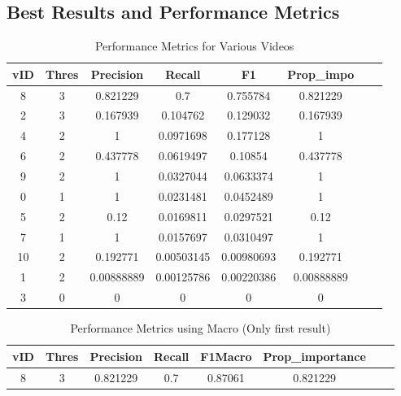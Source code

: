 \documentclass[conference]{IEEEtran}
\begin{document}
\subsection*{Best Results and Performance Metrics}
\begin{table}[H]

\begin{tabular}{|c|c|c|c|c|c|c|c|}
\hline
\textbf{vID} & \textbf{Thres} & \textbf{Precision} & \textbf{Recall} & \textbf{F1} & \textbf{Prop\_impo} \\
\hline
8 & 3 & 0.821229 & 0.7 & 0.755784  & 0.821229 \\
\hline
2 & 3 & 0.167939 & 0.104762 & 0.129032  & 0.167939 \\
\hline
4 & 2 & 1 & 0.0971698 & 0.177128  & 1 \\
\hline
6 & 2 & 0.437778 & 0.0619497 & 0.10854 & 0.437778 \\
\hline
9 & 2 & 1 & 0.0327044 & 0.0633374  & 1 \\
\hline
0 & 1 & 1 & 0.0231481 & 0.0452489  & 1 \\
\hline
5 & 2 & 0.12 & 0.0169811 & 0.0297521 & 0.12 \\
\hline
7 & 1 & 1 & 0.0157697 & 0.0310497  & 1 \\
\hline
10 & 2 & 0.192771 & 0.00503145 & 0.00980693  & 0.192771 \\
\hline
1 & 2 & 0.00888889 & 0.00125786 & 0.00220386 & 0.00888889 \\
\hline
3 & 0 & 0 & 0 & 0 & 0  \\
\hline
\end{tabular}
\caption{Performance Metrics for Various Videos}
\end{table}

\begin{table}[H]
\begin{tabular}{|c|c|c|c|c|c|c|c|}
\hline
\textbf{vID} & \textbf{Thres} & \textbf{Precision} & \textbf{Recall} & \textbf{F1Macro} & \textbf{Prop\_importance} \\
\hline
 8&3 &  0.821229 & 0.7 &        0.87061  &             0.821229   \\
\hline
\end{tabular}
\caption{Performance Metrics using Macro (Only first result)}
\end{table}
\end{document}
